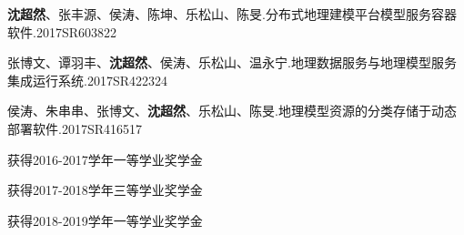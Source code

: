 \begin{resume}
  \begin{achievements}
    \item \textbf{沈超然}、张丰源、侯涛、陈坤、乐松山、陈旻.分布式地理建模平台模型服务容器软件.2017SR603822
    \item 张博文、谭羽丰、\textbf{沈超然}、侯涛、乐松山、温永宁.地理数据服务与地理模型服务集成运行系统.2017SR422324
    \item 侯涛、朱串串、张博文、\textbf{沈超然}、乐松山、陈旻.地理模型资源的分类存储于动态部署软件.2017SR416517
  \end{achievements}

  \begin{achievements}
    \item 获得2016-2017学年一等学业奖学金
    \item 获得2017-2018学年三等学业奖学金
    \item 获得2018-2019学年一等学业奖学金
  \end{achievements}

\end{resume}
